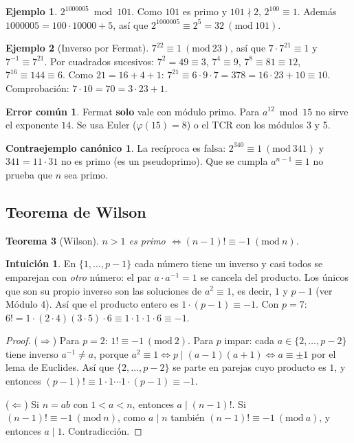 \documentclass[11pt,a4paper]{article}
\newtheorem{teorema}{Teorema}[section]
\theoremstyle{definition}
\newtheorem{ejemplo}[teorema]{Ejemplo}
\newcommand{\md}[1]{\ (\mathrm{mod}\ #1)}
\theoremstyle{notait}
\theoremstyle{nota}
\newtheorem*{intuicion}{Intuición}
\newtheorem*{contra}{Contraejemplo canónico}
\newtheorem*{trampaX}{Error común}
\newenvironment{trampa}{\begin{trampaX}\leavevmode\marginpar{\raggedleft\vspace*{-0.9\baselineskip}\dbend}\ignorespaces}{\end{trampaX}}
\begin{document}
\begin{ejemplo}
$2^{1000005}\bmod101$. Como $101$ es primo y $101\nmid2$, $2^{100}\equiv1$. Además $1000005=100\cdot10000+5$, así que $2^{1000005}\equiv2^5=32\md{101}$.
\end{ejemplo}

\begin{ejemplo}[Inverso por Fermat]
$7^{22}\equiv1\md{23}$, así que $7\cdot7^{21}\equiv1$ y $7^{-1}\equiv7^{21}$. Por cuadrados sucesivos: $7^2=49\equiv3$, $7^4\equiv9$, $7^8\equiv81\equiv12$, $7^{16}\equiv144\equiv6$. Como $21=16+4+1$: $7^{21}\equiv6\cdot9\cdot7=378=16\cdot23+10\equiv10$. Comprobación: $7\cdot10=70=3\cdot23+1$.
\end{ejemplo}

\begin{trampa}
Fermat \textbf{solo} vale con módulo primo. Para $a^{12}\bmod15$ no sirve el exponente $14$. Se usa Euler ($\varphi(15)=8$) o el TCR con los módulos 3 y 5.
\end{trampa}

\begin{contra}
La recíproca es falsa: $2^{340}\equiv1\md{341}$ y $341=11\cdot31$ no es primo (es un pseudoprimo). Que se cumpla $a^{n-1}\equiv1$ no prueba que $n$ sea primo.
\end{contra}

\subsection{Teorema de Wilson}

\begin{teorema}[Wilson]
$n>1$ es primo $\iff (n-1)!\equiv-1\md n$.
\end{teorema}

\begin{intuicion}
En $\{1,\dots,p-1\}$ cada número tiene un inverso y casi todos se emparejan con \emph{otro} número: el par $a\cdot a^{-1}=1$ se cancela del producto. Los únicos que son su propio inverso son las soluciones de $a^2\equiv1$, es decir, $1$ y $p-1$ (ver Módulo 4). Así que el producto entero es $1\cdot(p-1)\equiv-1$. Con $p=7$: $6!=1\cdot(2\cdot4)(3\cdot5)\cdot6\equiv1\cdot1\cdot1\cdot6\equiv-1$.
\end{intuicion}

\begin{proof}
($\Rightarrow$) Para $p=2$: $1!\equiv-1\md2$. Para $p$ impar: cada $a\in\{2,\dots,p-2\}$ tiene inverso $a^{-1}\ne a$, porque $a^2\equiv1\iff p\mid(a-1)(a+1)\iff a\equiv\pm1$ por el lema de Euclides. Así que $\{2,\dots,p-2\}$ se parte en parejas cuyo producto es $1$, y entonces $(p-1)!\equiv1\cdot1\cdots1\cdot(p-1)\equiv-1$.

($\Leftarrow$) Si $n=ab$ con $1<a<n$, entonces $a\mid(n-1)!$. Si $(n-1)!\equiv-1\md n$, como $a\mid n$ también $(n-1)!\equiv-1\md a$, y entonces $a\mid 1$. Contradicción.
\end{proof}
\end{document}
